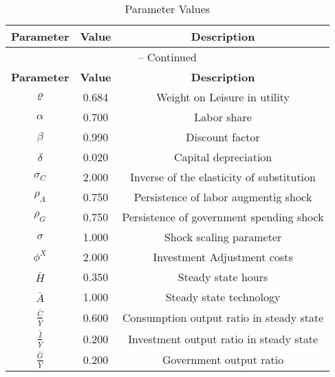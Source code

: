 \begin{center}
\begin{longtable}{ccc}
\caption{Parameter Values}\\%
\toprule%
\multicolumn{1}{c}{\textbf{Parameter}} &
\multicolumn{1}{c}{\textbf{Value}} &
 \multicolumn{1}{c}{\textbf{Description}}\\%
\midrule%
\endfirsthead
\multicolumn{3}{c}{{\tablename} \thetable{} -- Continued}\\%
\midrule%
\multicolumn{1}{c}{\textbf{Parameter}} &
\multicolumn{1}{c}{\textbf{Value}} &
  \multicolumn{1}{c}{\textbf{Description}}\\%
\midrule%
\endhead
${\varrho}$ 	 & 	 0.684 	 & 	 Weight on Leisure in utility\\
${\alpha}$ 	 & 	 0.700 	 & 	 Labor share\\
${\beta}$ 	 & 	 0.990 	 & 	 Discount factor\\
${\delta}$ 	 & 	 0.020 	 & 	 Capital depreciation\\
${\sigma_{C}}$ 	 & 	 2.000 	 & 	 Inverse of the elasticity of substitution\\
${\rho_{A}}$ 	 & 	 0.750 	 & 	 Persistence of labor augmentig shock\\
${\rho_{G}}$ 	 & 	 0.750 	 & 	 Persistence of government spending shock\\
${\sigma}$ 	 & 	 1.000 	 & 	 Shock scaling parameter\\
${\phi^X}$ 	 & 	 2.000 	 & 	 Investment Adjustment costs\\
$\bar{H}$ 	 & 	 0.350 	 & 	 Steady state hours\\
$\bar{A}$ 	 & 	 1.000 	 & 	 Steady state technology\\
$\frac{\bar{C}}{\bar{Y}}$ 	 & 	 0.600 	 & 	 Consumption output ratio in steady state\\
$\frac{\bar{I}}{\bar{Y}}$ 	 & 	 0.200 	 & 	 Investment output ratio in steady state\\
$\frac{\bar{G}}{\bar{Y}}$ 	 & 	 0.200 	 & 	 Government output ratio\\
\bottomrule%
\end{longtable}
\end{center}
